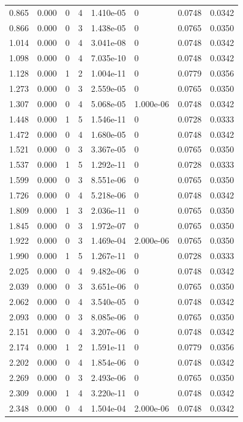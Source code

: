 \documentclass[preview]{standalone}
\begin{document}
{{\begin{tabular}{L{1.2cm}C{1.2cm} C{0.3cm}C{0.5cm} C{1.4cm}C{1.4cm} C{1.4cm}C{1.4cm}}
  0.865  &  0.000  & 0     &  4 &  1.410e-05  & 0  & 0.0748 &  0.0342   \\ 
  0.866  &  0.000  & 0     &  3 &  1.438e-05  & 0  & 0.0765 &  0.0350   \\ 
  1.014  &  0.000  & 0     &  4 &  3.041e-08  & 0  & 0.0748 &  0.0342   \\ 
  1.098  &  0.000  & 0     &  4 &  7.035e-10  & 0  & 0.0748 &  0.0342   \\ 
  1.128  &  0.000  & 1     &  2 &  1.004e-11  & 0  & 0.0779 &  0.0356   \\ 
  1.273  &  0.000  & 0     &  3 &  2.559e-05  & 0  & 0.0765 &  0.0350   \\ 
  1.307  &  0.000  & 0     &  4 &  5.068e-05  & 1.000e-06  & 0.0748 &  0.0342   \\ 
  1.448  &  0.000  & 1     &  5 &  1.546e-11  & 0  & 0.0728 &  0.0333   \\ 
  1.472  &  0.000  & 0     &  4 &  1.680e-05  & 0  & 0.0748 &  0.0342   \\ 
  1.521  &  0.000  & 0     &  3 &  3.367e-05  & 0  & 0.0765 &  0.0350   \\ 
  1.537  &  0.000  & 1     &  5 &  1.292e-11  & 0  & 0.0728 &  0.0333   \\ 
  1.599  &  0.000  & 0     &  3 &  8.551e-06  & 0  & 0.0765 &  0.0350   \\ 
  1.726  &  0.000  & 0     &  4 &  5.218e-06  & 0  & 0.0748 &  0.0342   \\ 
  1.809  &  0.000  & 1     &  3 &  2.036e-11  & 0  & 0.0765 &  0.0350   \\ 
  1.845  &  0.000  & 0     &  3 &  1.972e-07  & 0  & 0.0765 &  0.0350   \\ 
  1.922  &  0.000  & 0     &  3 &  1.469e-04  & 2.000e-06  & 0.0765 &  0.0350   \\ 
  1.990  &  0.000  & 1     &  5 &  1.267e-11  & 0  & 0.0728 &  0.0333   \\ 
  2.025  &  0.000  & 0     &  4 &  9.482e-06  & 0  & 0.0748 &  0.0342   \\ 
  2.039  &  0.000  & 0     &  3 &  3.651e-06  & 0  & 0.0765 &  0.0350   \\ 
  2.062  &  0.000  & 0     &  4 &  3.540e-05  & 0  & 0.0748 &  0.0342   \\ 
  2.093  &  0.000  & 0     &  3 &  8.085e-06  & 0  & 0.0765 &  0.0350   \\ 
  2.151  &  0.000  & 0     &  4 &  3.207e-06  & 0  & 0.0748 &  0.0342   \\ 
  2.174  &  0.000  & 1     &  2 &  1.591e-11  & 0  & 0.0779 &  0.0356   \\ 
  2.202  &  0.000  & 0     &  4 &  1.854e-06  & 0  & 0.0748 &  0.0342   \\ 
  2.269  &  0.000  & 0     &  3 &  2.493e-06  & 0  & 0.0765 &  0.0350   \\ 
  2.309  &  0.000  & 1     &  4 &  3.220e-11  & 0  & 0.0748 &  0.0342   \\ 
  2.348  &  0.000  & 0     &  4 &  1.504e-04  & 2.000e-06  & 0.0748 &  0.0342   \\ 
\hline 
\end{tabular} 

}}
\end{document}
